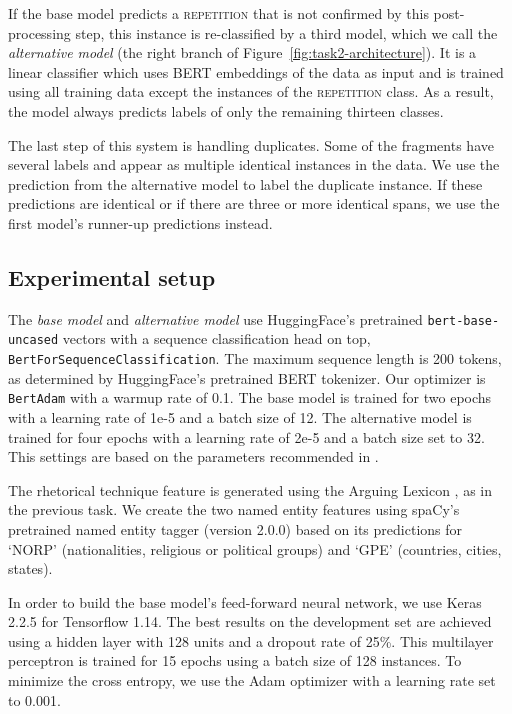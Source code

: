 \documentclass[11pt]{article}
\begin{document}
If the base model predicts a \textsc{repetition} that is not confirmed by this post-processing step, this instance is re-classified by a third model, which we call the \textit{alternative model}
(the right branch of Figure~\ref{fig:task2-architecture}).
It is a linear classifier which uses BERT embeddings of the data as input and is trained using all training data except the instances of the \textsc{repetition} class.
As a result, the model always predicts labels of only the remaining thirteen classes.

The last step of this system is handling duplicates.
Some of the fragments have several labels and appear as multiple identical instances in the data.
We use the prediction from the alternative model to label the duplicate instance.
If these predictions are identical or if there are three or more identical spans, we use the first model's runner-up predictions instead.


\subsection{Experimental setup}

The \textit{base model} and \textit{alternative model} use HuggingFace's pretrained \texttt{bert-base-uncased}
vectors with a sequence classification head on top, \texttt{BertForSequenceClassification}. The maximum sequence length is 200 tokens, as determined by HuggingFace's pretrained BERT tokenizer.
Our optimizer is \texttt{BertAdam} with a warmup rate of 0.1. 
The base model is trained for two epochs with a learning rate of 1e-5 and a batch size of 12.
The alternative model is trained for four epochs with a learning rate of 2e-5 and a batch size set to 32.
This settings are based on the parameters recommended in . 

The rhetorical technique feature is generated using the Arguing Lexicon \cite{somasundaran2007detecting}, as in the previous task.
We create the two named entity features using spaCy's pretrained named entity tagger (version 2.0.0) based on its predictions for `NORP' (nationalities, religious or political groups) and `GPE' (countries, cities, states).


In order to build the base model's feed-forward neural network, we use Keras 2.2.5 for Tensorflow 1.14.
The best results on the development set are achieved using a hidden layer with 128 units and a dropout rate of 25\%.
This multilayer perceptron is trained for 15 epochs using a batch size of 128 instances.
To minimize the cross entropy, we use the Adam optimizer with a learning rate set to 0.001.
\end{document}
